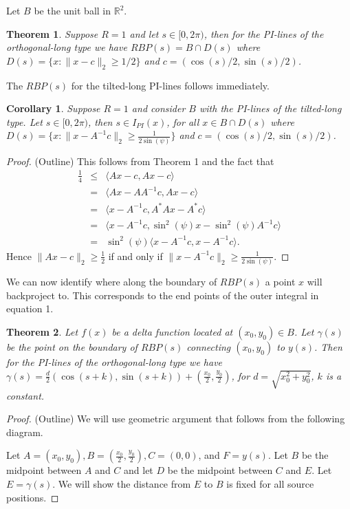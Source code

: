 \documentclass[landscape,final]{baposter}
\newtheorem{theorem}{Theorem}
\newtheorem{corollary}{Corollary}
\begin{document}
\begin{poster}
{\begin{multicols}{2}
Let $B$ be the unit ball in $\mathbb{R}^2$.
\begin{theorem}
Suppose $R = 1$ and let $s \in [0, 2 \pi)$, then for the PI-lines of the orthogonal-long type we have $RBP(s) = B \cap D(s)$ where $D(s) = \{x : \|x - c \|_{2} \ge 1 / 2\}$ and $c = (\cos(s) / 2, \sin(s) / 2)$.
\end{theorem}
The $RBP(s)$ for the tilted-long PI-lines follows immediately.
\begin{corollary}
Suppose $R = 1$ and consider $B$ with the PI-lines of the tilted-long type.  Let $s \in [0, 2 \pi)$, then $s \in I_{PI}(x)$, for all $x \in B \cap D(s)$ where $D(s) = \{x : \|x - A^{-1}c \|_{2} \ge \frac 1 {2 \sin(\psi)} \}$ and $c = (\cos(s) / 2, \sin(s) / 2)$.
\end{corollary}
\begin{proof}(Outline)
This follows from Theorem 1 and the fact that
\begin{eqnarray*}
	\frac 1 4 & \le & \langle Ax - c, Ax - c \rangle \\
	& = & \langle Ax - A A^{-1}c, Ax - c \rangle \\
	& = & \langle x - A^{-1}c, A^* Ax - A^* c \rangle \\
	& = & \langle x - A^{-1}c, \sin^{2}(\psi) x - \sin^{2}(\psi)A^{-1} c \rangle \\
	& = & \sin^2 (\psi) \langle x - A^{-1}c, x - A^{-1}c \rangle.
\end{eqnarray*}
Hence $\| Ax - c \|_{2} \ge \frac 1 2$ if and only if $\| x - A^{-1}c \|_{2} \ge \frac 1 {2 \sin (\psi)}$.
\end{proof}

We can now identify where along the boundary of $RBP(s)$ a point $x$ will backproject to.  This corresponds to the end points of the outer integral in equation 1.

\begin{theorem}
\label{artifact_shape}
Let $f(x)$ be a delta function located at $(x_0, y_0) \in B$.  Let $\gamma(s)$ be the point on the boundary of $RBP(s)$ connecting $(x_0, y_0)$ to $y(s)$.  Then for the PI-lines of the orthogonal-long type we have $\gamma(s) = \frac d 2 (\cos(s + k), \sin(s + k)) + (\frac {x_0} 2, \frac {y_0}  2)$, for $d = \sqrt{x_0^2 + y_0^2}$, $k$ is a constant.
\end{theorem}
\begin{proof}(Outline)
We will use geometric argument that follows from the following diagram.
	\begin{center}
		
	\end{center}
Let $A = (x_0, y_0), B = (\frac {x_0} {2}, \frac {y_0} {2}), C = (0, 0)$, and $F = y(s)$.  Let $B$ be the midpoint between $A$ and $C$ and let $D$ be the midpoint between $C$ and $E$.  Let $E = \gamma(s)$.  We will show the distance from $E$ to $B$ is fixed for all source positions.


\end{proof}
\end{multicols}}
\end{poster}
\end{document}

